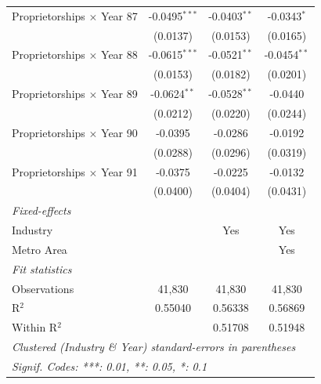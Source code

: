 \documentclass[
  12pt]{article}
\theoremstyle{definition}
\theoremstyle{remark}
\begin{document}
\begin{table}
\begin{minipage}{\linewidth}
\begin{tabular}{lccc}
   Proprietorships $\times$ Year 87  & -0.0495$^{***}$ & -0.0403$^{**}$ & -0.0343$^{*}$\\   
                                     & (0.0137)        & (0.0153)       & (0.0165)\\   
   Proprietorships $\times$ Year 88  & -0.0615$^{***}$ & -0.0521$^{**}$ & -0.0454$^{**}$\\   
                                     & (0.0153)        & (0.0182)       & (0.0201)\\   
   Proprietorships $\times$ Year 89  & -0.0624$^{**}$  & -0.0528$^{**}$ & -0.0440\\   
                                     & (0.0212)        & (0.0220)       & (0.0244)\\   
   Proprietorships $\times$ Year 90  & -0.0395         & -0.0286        & -0.0192\\   
                                     & (0.0288)        & (0.0296)       & (0.0319)\\   
   Proprietorships $\times$ Year 91  & -0.0375         & -0.0225        & -0.0132\\   
                                     & (0.0400)        & (0.0404)       & (0.0431)\\   
   \midrule
   \emph{Fixed-effects}\\
   Industry                          &                 & Yes            & Yes\\  
   Metro Area                        &                 &                & Yes\\  
   \midrule
   \emph{Fit statistics}\\
   Observations                      & 41,830          & 41,830         & 41,830\\  
   R$^2$                             & 0.55040         & 0.56338        & 0.56869\\  
   Within R$^2$                      &                 & 0.51708        & 0.51948\\  
   \midrule \midrule
   \multicolumn{4}{l}{\emph{Clustered (Industry \& Year) standard-errors in parentheses}}\\
   \multicolumn{4}{l}{\emph{Signif. Codes: ***: 0.01, **: 0.05, *: 0.1}}\\
\end{tabular}

\end{minipage}%
\newline
\begin{minipage}{\linewidth}


\end{minipage}
\end{table}
\end{document}
